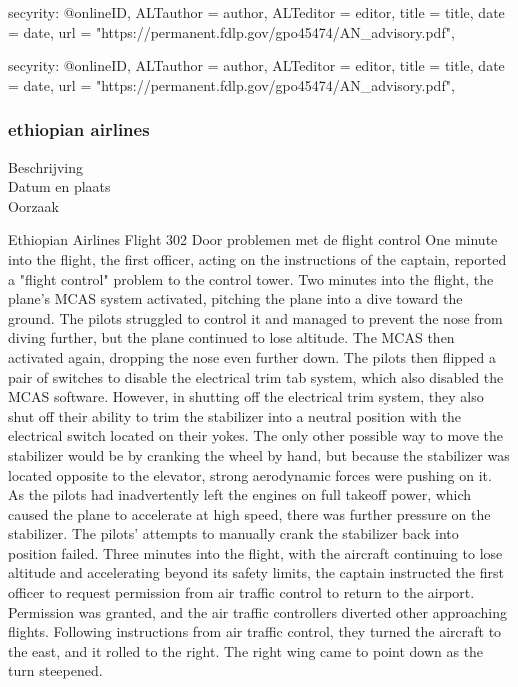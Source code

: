 {{{{{{{{{secyrity:
@online{ID,	ALTauthor = {author},	ALTeditor = {editor},	title = {title},	date = {date},	url = {"https://permanent.fdlp.gov/gpo45474/AN_advisory.pdf"},}


secyrity:
@online{ID,	ALTauthor = {author},	ALTeditor = {editor},	title = {title},	date = {date},	url = {"https://permanent.fdlp.gov/gpo45474/AN_advisory.pdf"},}



\subsubsection{ethiopian airlines}

\begin{description}
\item[Beschrijving]
\item[Datum en plaats] 
\item[Oorzaak]
\end{description}
Ethiopian Airlines Flight 302
Door problemen met de flight control
One minute into the flight, the first officer, acting on the instructions of the captain, reported a "flight control" problem to the control tower.
Two minutes into the flight, the plane's MCAS system activated, pitching the plane into a dive toward the ground. The pilots struggled to control it and managed to prevent the nose from diving further, but the plane continued to lose altitude.
The MCAS then activated again, dropping the nose even further down. The pilots then flipped a pair of switches to disable the electrical trim tab system, which also disabled the MCAS software. However, in shutting off the electrical trim system, they also shut off their ability to trim the stabilizer into a neutral position with the electrical switch located on their yokes. The only other possible way to move the stabilizer would be by cranking the wheel by hand, but because the stabilizer was located opposite to the elevator, strong aerodynamic forces were pushing on it.
As the pilots had inadvertently left the engines on full takeoff power, which caused the plane to accelerate at high speed, there was further pressure on the stabilizer. The pilots' attempts to manually crank the stabilizer back into position failed.
Three minutes into the flight, with the aircraft continuing to lose altitude and accelerating beyond its safety limits, the captain instructed the first officer to request permission from air traffic control to return to the airport. Permission was granted, and the air traffic controllers diverted other approaching flights. Following instructions from air traffic control, they turned the aircraft to the east, and it rolled to the right. The right wing came to point down as the turn steepened.
}}}}}}}}}
